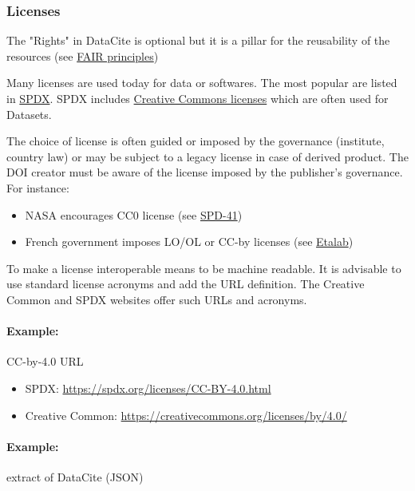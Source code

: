\documentclass[11pt,a4paper]{ivoa}
\begin{document}
\subsubsection{Licenses}\hypertarget{licenses}{}\label{licenses}

The "Rights" in DataCite is optional but it is a pillar for the reusability of the resources (see \href{https://www.go-fair.org/fair-principles/}{FAIR principles})

Many licenses are used today for data or softwares. The most popular are listed in \href{https://spdx.org/licenses/}{SPDX}. SPDX includes \href{https://creativecommons.org/licenses/}{Creative Commons licenses} which are often used for Datasets.

The choice of license is often guided or imposed by the governance (institute, country law) or may be subject to a legacy license in case of derived product. The DOI creator must be aware of the license imposed by the publisher's governance. For instance:

\begin{itemize}
\item{} NASA encourages CC0 license (see \href{https://science.nasa.gov/wp-content/uploads/2023/08/smd-information-policy-spd-41a.pdf}{SPD-41})
\item{} French government imposes LO/OL or CC-by licenses (see \href{https://www.etalab.gouv.fr/}{Etalab})
\end{itemize}

To make a license interoperable means to be machine readable. It is advisable to use standard license acronyms and add the URL definition. The Creative Common and SPDX websites offer such URLs and acronyms.\\

\paragraph{Example:} CC-by-4.0 URL

\begin{itemize}
\item{} SPDX:  \href{https://spdx.org/licenses/CC-BY-4.0.html}{https://spdx.org/licenses/CC-BY-4.0.html}
\item{} Creative Common: \href{https://creativecommons.org/licenses/by/4.0/}{https://creativecommons.org/licenses/by/4.0/}
\end{itemize}

\paragraph{Example:} extract of DataCite (JSON)
\end{document}
